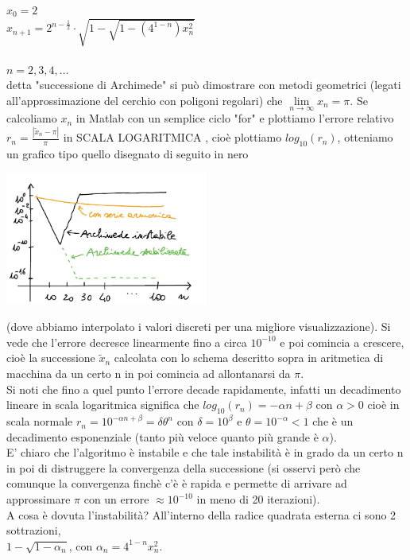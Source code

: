 \documentclass[12pt]{article}
\begin{document}
$x_0=2$\\
$x_{n+1}=2^{n-\frac{1}{2}}\cdot\sqrt{1-\sqrt{1-(4^{1-n})x_{n}^2}}$\\\\
$n=2,3,4,\dotso$\\
detta "successione di Archimede" si può dimostrare con metodi geometrici (legati all'approssimazione del cerchio con poligoni regolari) che $\lim\limits_{n\to\infty} x_n= \pi$. Se calcoliamo $x_n$ in Matlab con un semplice ciclo "for" e plottiamo l'errore relativo $r_n=\frac{|\tilde{x}_n-\pi|}{\pi}$ in SCALA LOGARITMICA , cioè plottiamo $log_{10}(r_n)$, otteniamo un grafico tipo quello disegnato di seguito in nero\\
\begin{center}
    \includegraphics[width=0.5\textwidth]{pag28.JPG}
\end{center}
(dove abbiamo interpolato i valori discreti per una migliore visualizzazione). Si vede che l'errore decresce linearmente fino a circa $10^{-10}$ e poi comincia a crescere, cioè la successione $\tilde{x}_n$ calcolata
con lo schema descritto sopra in aritmetica di macchina da un certo n in poi comincia ad allontanarsi da $\pi$.\\
Si noti che fino a quel punto l'errore decade rapidamente, infatti un decadimento lineare in scala logaritmica significa che $log_{10}(r_n)=-\alpha n+\beta$ con $\alpha >0$ cioè in scala normale $r_n=10^{-\alpha n+\beta}=\delta\theta^n$ con $\delta=10^{\beta}$ e $\theta=10^{-\alpha}< 1$ che è un decadimento esponenziale (tanto più veloce quanto più grande è $\alpha$).\\
E' chiaro che l'algoritmo è instabile e che tale instabilità è in grado da un certo n in poi di distruggere la convergenza della successione (si osservi però che comunque la convergenza finchè c'è è rapida e permette di arrivare ad approssimare $\pi$ con un errore $\approx10^{-10}$ in meno di 20 iterazioni).\\ A cosa è dovuta l'instabilità? All'interno della radice quadrata esterna ci sono 2 sottrazioni, \\$1-\sqrt{1-\alpha_n}$, con $\alpha_n=4^{1-n}x^{2}_n$.\\
\end{document}
